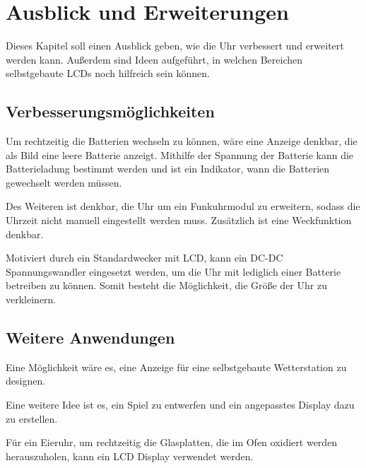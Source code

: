 \section{Ausblick und Erweiterungen}

Dieses Kapitel soll einen Ausblick geben, wie die Uhr verbessert und erweitert werden kann. Außerdem sind Ideen aufgeführt, in welchen Bereichen selbstgebaute LCDs noch hilfreich sein können.

\subsection{Verbesserungsmöglichkeiten}

Um rechtzeitig die Batterien wechseln zu können, wäre eine Anzeige denkbar, die als Bild eine leere Batterie anzeigt. Mithilfe der Spannung der Batterie kann die Batterieladung bestimmt werden und ist ein Indikator, wann die Batterien gewechselt werden müssen.

Des Weiteren ist denkbar, die Uhr um ein Funkuhrmodul zu erweitern, sodass die Uhrzeit nicht manuell eingestellt werden muss. Zusätzlich ist eine Weckfunktion denkbar.

Motiviert durch ein Standardwecker mit LCD, kann ein DC-DC Spannungswandler eingesetzt werden, um die Uhr mit lediglich einer Batterie betreiben zu können. Somit besteht die Möglichkeit, die Größe der Uhr zu verkleinern.

\subsection{Weitere Anwendungen}

Eine Möglichkeit wäre es, eine Anzeige für eine selbstgebaute Wetterstation zu designen.

Eine weitere Idee ist es, ein Spiel zu entwerfen und ein angepasstes Display dazu zu erstellen.

Für ein Eieruhr, um rechtzeitig die Glasplatten, die im Ofen oxidiert werden herauszuholen, kann ein LCD Display verwendet werden.
